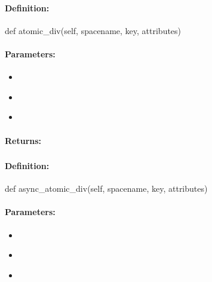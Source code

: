 \paragraph{Definition:}
\begin{pythoncode}
def atomic_div(self, spacename, key, attributes)
\end{pythoncode}

\paragraph{Parameters:}
\begin{itemize}[noitemsep]
\item {}\\

\item {}\\

\item {}\\

\end{itemize}

\paragraph{Returns:}


\pagebreak
\subsubsection{}
\label{api:python:async_atomic_div}


\paragraph{Definition:}
\begin{pythoncode}
def async_atomic_div(self, spacename, key, attributes)
\end{pythoncode}

\paragraph{Parameters:}
\begin{itemize}[noitemsep]
\item {}\\

\item {}\\

\item {}\\

\end{itemize}

